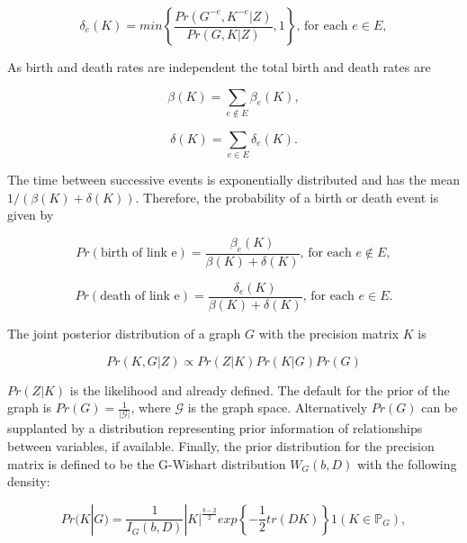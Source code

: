 \documentclass[a4paper,12pt,twoside,openright]{report}
\begin{document}
\begin{equation}
\delta _e(K)=min\left\lbrace \frac{Pr(G^{-e}, K^{-e}|Z)}{Pr(G,K|Z)},1 \right\rbrace \text{, for each }  e \in E,
\end{equation}

As birth and death rates are independent the total birth and death rates are

\begin{equation}
\beta(K) = \sum_{e \notin E}\beta_e(K),
\end{equation}
 
\begin{equation}
\delta(K) = \sum_{e \in E}\delta_e(K).
\end{equation}

The time between successive events is exponentially distributed and has the mean $1/(\beta(K)+\delta(K))$. Therefore, the probability of a birth or death event is given by

\begin{equation}
Pr(\text{birth of link e}) = \frac{\beta_e(K)}{\beta(K) + \delta(K)} \text{, for each } e \notin E,
\label{eq:birth.prob}
\end{equation}

\begin{equation}
Pr(\text{death of link e}) = \frac{\delta_e(K)}{\beta(K) + \delta(K)} \text{, for each } e \in E.
\label{eq:death.prob}
\end{equation}

The joint posterior distribution of a graph $G$ with the precision matrix $K$ is 

\begin{equation}
Pr(K,G|Z) \propto Pr(Z|K) Pr(K|G) Pr(G)
\end{equation}

$Pr(Z|K)$ is the likelihood and already defined. The default for the prior of the graph is $Pr(G)=\frac{1}{|\mathcal{G}|}$, where $\mathcal{G}$ is the graph space. Alternatively $Pr(G)$ can be supplanted by a distribution representing prior information of relationships between variables, if available. Finally, the prior distribution for the precision matrix is defined to be the G-Wishart distribution $W_G(b,D)$ with the following density:

\begin{equation}
Pr(K|G) = \frac{1}{I_G(b,D)}|K|^{\frac{b-2}{2}}exp\left\lbrace-\frac{1}{2}tr(DK)\right\rbrace 1(K \in \mathbb{P}_G),
\end{equation}
\end{document}
